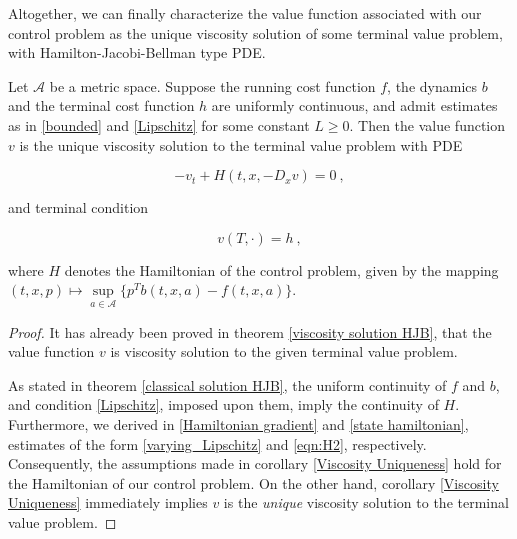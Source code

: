 	  Altogether, we can finally characterize the value function associated with our control problem as the unique viscosity solution of some terminal value problem, with Hamilton-Jacobi-Bellman type PDE.
	  
	  \begin{theorem}
	  	\label{value characterization}
	  	Let $ \mathcal{A} $ be a metric space. Suppose the running cost function $ f $, the dynamics $ b $ and the terminal cost function $ h $ are uniformly continuous, and admit estimates as in \eqref{bounded} and \eqref{Lipschitz} for some constant $ L \geq 0 $. Then the value function $ v $ is the unique viscosity solution to the terminal value problem with PDE
	  	
	  	\begin{equation*}
	  	-v_t + H(t, x, -D_x v) = 0 \ ,
	  	\end{equation*}
	  	
	  	and terminal condition
	  	
	  	\begin{equation*}
	  	v(T, \cdot) = h \ ,
	  	\end{equation*}
	  	
	  	where $ H $ denotes the Hamiltonian of the control problem, given by the mapping $ (t, x, p) \mapsto \sup\limits_{a \in \mathcal{A}} \bigg\{ p^{T} b(t, x, a) - f(t, x, a) \bigg\} $.
	  	
	  	\begin{proof}
	  		It has already been proved in theorem \ref{viscosity solution HJB}, that the value function $ v $ is viscosity solution to the given terminal value problem. 
	  		
	  		As stated in theorem \ref{classical solution HJB}, the uniform continuity of $ f $ and $ b $, and condition \eqref{Lipschitz}, imposed upon them, imply the continuity of $ H $. Furthermore, we derived in \ref{Hamiltonian gradient} and \ref{state hamiltonian}, estimates of the form \eqref{varying_Lipschitz} and \eqref{eqn:H2}, respectively. Consequently, the assumptions made in corollary \ref{Viscosity Uniqueness} hold for the Hamiltonian of our control problem. On the other hand, corollary \ref{Viscosity Uniqueness} immediately implies $ v $ is the \emph{unique} viscosity solution to the terminal value problem.
	  	\end{proof}
	  \end{theorem}  